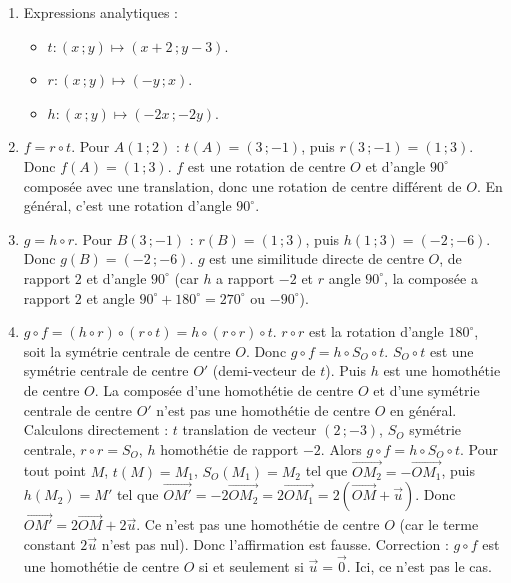 \begin{enumerate}[label=\arabic*)]
    \item Expressions analytiques :
    \begin{itemize}
        \item \(t : (x\,; y) \mapsto (x+2\,; y-3)\).
        \item \(r : (x\,; y) \mapsto (-y\,; x)\).
        \item \(h : (x\,; y) \mapsto (-2x\,; -2y)\).
    \end{itemize}
    \item \(f = r \circ t\). Pour \(A(1\,; 2)\) : \(t(A) = (3\,; -1)\), puis \(r(3\,; -1) = (1\,; 3)\). Donc \(f(A) = (1\,; 3)\). \(f\) est une rotation de centre \(O\) et d'angle \(90^\circ\) composée avec une translation, donc une rotation de centre différent de \(O\). En général, c'est une rotation d'angle \(90^\circ\).
    \item \(g = h \circ r\). Pour \(B(3\,; -1)\) : \(r(B) = (1\,; 3)\), puis \(h(1\,; 3) = (-2\,; -6)\). Donc \(g(B) = (-2\,; -6)\). \(g\) est une similitude directe de centre \(O\), de rapport \(2\) et d'angle \(90^\circ\) (car \(h\) a rapport \(-2\) et \(r\) angle \(90^\circ\), la composée a rapport \(2\) et angle \(90^\circ + 180^\circ = 270^\circ\) ou \(-90^\circ\)).
    \item \(g \circ f = (h \circ r) \circ (r \circ t) = h \circ (r \circ r) \circ t\). \(r \circ r\) est la rotation d'angle \(180^\circ\), soit la symétrie centrale de centre \(O\). Donc \(g \circ f = h \circ S_O \circ t\). \(S_O \circ t\) est une symétrie centrale de centre \(O'\) (demi-vecteur de \(t\)). Puis \(h\) est une homothétie de centre \(O\). La composée d'une homothétie de centre \(O\) et d'une symétrie centrale de centre \(O'\) n'est pas une homothétie de centre \(O\) en général. Calculons directement : \(t\) translation de vecteur \((2\,; -3)\), \(S_O\) symétrie centrale, \(r \circ r = S_O\), \(h\) homothétie de rapport \(-2\). Alors \(g \circ f = h \circ S_O \circ t\). Pour tout point \(M\), \(t(M) = M_1\), \(S_O(M_1) = M_2\) tel que \(\overrightarrow{OM_2} = -\overrightarrow{OM_1}\), puis \(h(M_2) = M'\) tel que \(\overrightarrow{OM'} = -2 \overrightarrow{OM_2} = 2 \overrightarrow{OM_1} = 2 (\overrightarrow{OM} + \vec{u})\). Donc \(\overrightarrow{OM'} = 2 \overrightarrow{OM} + 2\vec{u}\). Ce n'est pas une homothétie de centre \(O\) (car le terme constant \(2\vec{u}\) n'est pas nul). Donc l'affirmation est fausse. Correction : \(g \circ f\) est une homothétie de centre \(O\) si et seulement si \(\vec{u} = \vec{0}\). Ici, ce n'est pas le cas.
\end{enumerate}

